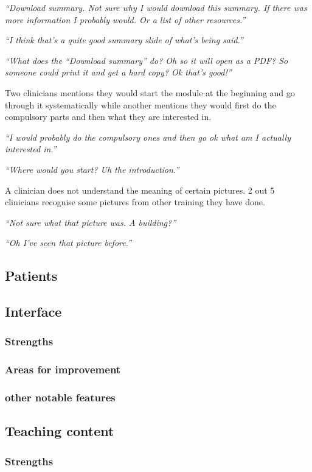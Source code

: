 \documentclass{sigchi}
\begin{document}
\textit{“Download summary. Not sure why I would download this summary. If there was more information I probably would. Or a list of other resources.”}

\textit{“I think that’s a quite good summary slide of what’s being said.”}

\textit{“What does the “Download summary” do? Oh so it will open as a PDF? So someone could print it and get a hard copy? Ok that’s good!”}

Two clinicians mentions they would start the module at the beginning and go through it systematically while another mentions they would first do the compulsory parts and then what they are interested in.

\textit{“I would probably do the compulsory ones and then go ok what am I actually interested in.”}

\textit{“Where would you start? Uh the introduction.”}

A clinician does not understand the meaning of certain pictures. 2 out 5 clinicians recognise some pictures from other training they have done.

\textit{“Not sure what that picture was. A building?”}

\textit{“Oh I’ve seen that picture before.”}

\subsection{Patients}

\subsection{Interface}
\subsubsection{Strengths}
\subsubsection{Areas for improvement}
\subsubsection{other notable features}

\subsection{Teaching content}
\subsubsection{Strengths}
\end{document}
